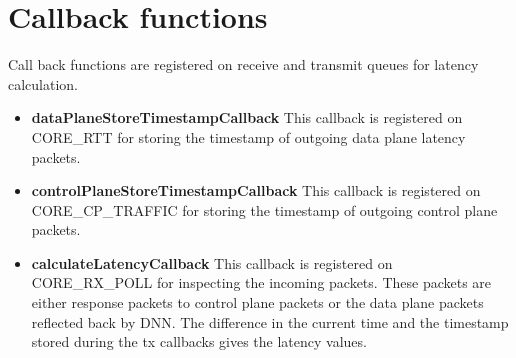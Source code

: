 \section{Callback functions}
Call back functions are registered on receive and transmit queues for latency calculation.
\begin{itemize}
	\item \textbf{dataPlaneStoreTimestampCallback}
	      This callback is registered on CORE\_RTT for storing the timestamp of outgoing  data plane latency packets.
	\item \textbf{controlPlaneStoreTimestampCallback} This callback is registered on CORE\_CP\_TRAFFIC for storing the timestamp of outgoing control plane packets.
	\item \textbf{calculateLatencyCallback} This callback is registered on CORE\_RX\_POLL for inspecting the incoming packets.
	      These packets are either response packets to control plane packets or the data plane packets reflected back by DNN. The difference in the current time and the timestamp stored during the tx callbacks gives the latency values.
\end{itemize}
%
